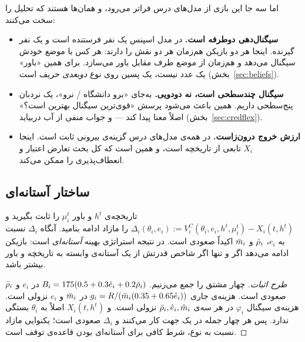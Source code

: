 \documentclass[12pt,a4paper]{article}
\begin{document}
اما سه جا این بازی از مدل‌های درس فراتر می‌رود، و همان‌ها هستند که تحلیل را
سخت می‌کنند:

\begin{itemize}[leftmargin=1.4em,itemsep=2pt]
  \item \textbf{سیگنال‌دهی دوطرفه است.} در مدل اسپنس یک نفر فرستنده است و
        یک نفر گیرنده. اینجا هر دو بازیکن هم‌زمان هر دو نقش را دارند: هر
        کس با موضع خودش سیگنال می‌دهد و هم‌زمان از موضع طرف مقابل باور
        می‌سازد. برای همین «باور» یک عدد نیست، یک پسین روی نوع
        \emph{دوبعدی} حریف است (بخش~\ref{sec:beliefs}).
  \item \textbf{سیگنال چندسطحی است، نه دودویی.} به‌جای «برو دانشگاه / نرو»،
        یک نردبان پنج‌سطحی داریم. همین باعث می‌شود پرسش «قوی‌ترین سیگنال
        بهترین است؟» اصلاً معنا پیدا کند — و جواب منفی از آب دربیاید
        (بخش~\ref{sec:credflex}).
  \item \textbf{ارزش خروج درون‌زاست.} در همه‌ی مدل‌های درس گزینه‌ی بیرونی
        ثابت است. اینجا $X_i$ تابعی از تاریخچه است، و همین است که کل بحث
        تعارض اعتبار و انعطاف‌پذیری را ممکن می‌کند.
\end{itemize}

\subsection{ساختار آستانه‌ای}

\begin{proposition}\label{pr:cutoff}
تاریخچه‌ی $h^t$ و باور $\mu_i^t$ را ثابت بگیرید و
$\Delta_i(\theta_i,e_i):=V_i^C(\theta_i,e_i,h^t,\mu_i^t)-X_i(t,h^t)$
را مازاد ادامه بنامید. آنگاه $\Delta_i$ نسبت به $e_i$، $\bar{\rho}_i$ و $\bar{m}_i$
اکیداً صعودی است. در نتیجه استراتژی بهینه \emph{آستانه‌ای} است: بازیکن ادامه
می‌دهد اگر و تنها اگر شاخص قدرتش از یک آستانه‌ی وابسته به تاریخچه و باور
بیشتر باشد.
\end{proposition}

\begin{proof}[طرح اثبات]
چهار مشتق را جمع می‌زنیم. $B_i=175(0.5+0.3\hat{e}_i+0.2\bar{\rho}_i)$ در $e_i$ و
$\bar{\rho}_i$ صعودی است. هزینه‌ی جاری $g_i=R/(\bar{m}_i(0.35+0.65\hat{e}_i))$ در
$\bar{m}_i$ و $e_i$ نزولی است. هزینه‌ی سیگنال $\varphi_i$ در هر سه‌ی
$\bar{\rho}_i,\hat{e}_i,\hat{m}_i$ نزولی است. و $X_i(t,h^t)$ اصلاً به $\theta_i$
بستگی ندارد. پس هر چهار جمله در یک جهت کار می‌کنند و $\Delta_i$ صعودی است؛
یکنوایی مازاد نسبت به نوع، شرط کافی برای آستانه‌ای بودن قاعده‌ی توقف است.
\end{proof}
\end{document}
